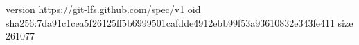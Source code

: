 version https://git-lfs.github.com/spec/v1
oid sha256:7da91c1cea5f26125ff5b6999501cafdde4912ebb99f53a93610832e343fe411
size 261077
